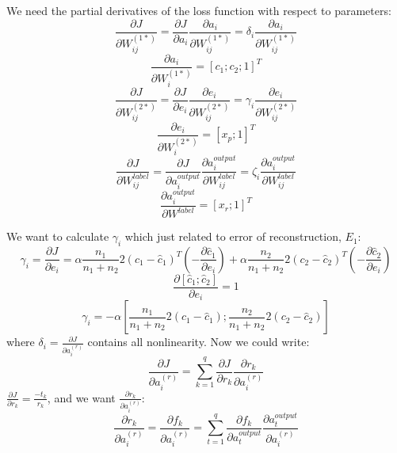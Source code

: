 \documentclass[twoside,12pt]{article}
\begin{document}
We need the partial derivatives of the loss function with respect to parameters:
\begin{equation}
\frac{\partial J}{\partial W^{(1*)}_{ij}} = \frac{\partial J}{\partial a_i}\frac{\partial a_i}{\partial W^{(1*)}_{ij}}=\delta_i \frac{\partial a_i}{\partial W^{(1*)}_{ij}}
\end{equation}
\begin{equation}
\frac{\partial a_i}{\partial W^{(1*)}_i}=[c_1;c_2;1]^T
\end{equation}
\begin{equation}
\frac{\partial J}{\partial W^{(2*)}_{ij}} = \frac{\partial J}{\partial e_i}\frac{\partial e_i}{\partial W^{(2*)}_{ij}}=\gamma_i \frac{\partial e_i}{\partial W^{(2*)}_{ij}}
\end{equation}
\begin{equation}
\frac{\partial e_i}{\partial W^{(2*)}_i}=[x_p;1]^T
\end{equation}
\begin{equation}
\frac{\partial J}{\partial W^{label}_{ij}} = \frac{\partial J}{\partial a^{output}_i}\frac{\partial a^{output}_i}{\partial W^{label}_{ij}}=\zeta_i \frac{\partial a^{output}_i}{\partial W^{label}_{ij}}
\end{equation}
\begin{equation}
\frac{\partial a^{output}_i}{\partial W^{label}}=[x_r;1]^T
\end{equation}

We want to calculate $\gamma_i$ which just related to error of reconstruction, $E_1$:
\begin{equation}
\gamma_i=\frac{\partial J}{\partial e_i} = \alpha\frac{n_1}{n_1+n_2}2(c_1-\hat{c}_1)^T(-\frac{\partial \hat{c}_1}{\partial e_i})+\alpha\frac{n_2}{n_1+n_2}2(c_2-\hat{c}_2)^T(-\frac{\partial \hat{c}_2}{\partial e_i})
\end{equation}
\begin{equation}
\frac{\partial [\hat{c}_1;\hat{c}_2]}{\partial e_i}=1
\end{equation}
\begin{equation}
\gamma_i=-\alpha[\frac{n_1}{n_1+n_2}2(c_1-\hat{c}_1);\frac{n_2}{n_1+n_2}2(c_2-\hat{c}_2)]
\end{equation}
where $\delta_i=\frac{\partial J}{\partial a^{(r)}_i}$ contains all nonlinearity. Now we could write:
\begin{equation}
\frac{\partial J}{\partial a^{(r)}_i}= \sum_{k=1}^q\frac{\partial J}{\partial r_k}\frac{\partial r_k}{\partial a^{(r)}_i}
\end{equation}
$\frac{\partial J}{\partial r_k}=\frac{-t_k}{r_k}$, and we want $\frac{\partial r_k}{\partial a^{(r)}_i}$:
\begin{equation}
\frac{\partial r_k}{\partial a^{(r)}_i}=\frac{\partial f_k}{\partial a^{(r)}_i}=\sum_{t=1}^{q}\frac{\partial f_k}{\partial a^{output}_{t}}\frac{\partial a^{output}_t}{\partial a^{(r)}_i}
\end{equation}
\end{document}
